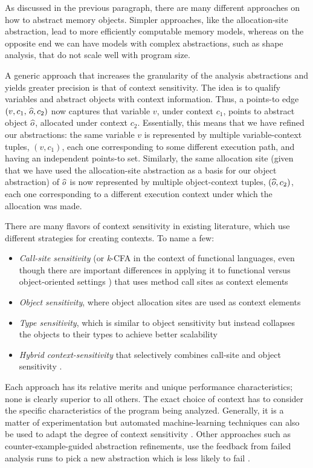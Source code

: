As discussed in the previous paragraph, there are many different
approaches on how to abstract memory objects. Simpler approaches, like
the allocation-site abstraction, lead to more efficiently computable
memory models, whereas on the opposite end we can have models with
complex abstractions, such as shape analysis, that do not scale well
with program size.

A generic approach that increases the granularity of the analysis
abstractions and yields greater precision is that of context
sensitivity. The idea is to qualify variables and abstract objects
with context information. Thus, a points-to edge
\((v, c_1,\, \widehat{o}, c_2)\) now captures that variable \(v\), under
context \(c_1\), points to abstract object \(\widehat{o}\), allocated
under context \(c_2\). Essentially, this means that we have refined
our abstractions: the same variable \(v\) is represented by multiple
variable-context tuples, \((v, c_1)\), each one corresponding to some
different execution path, and having an independent points-to
set. Similarly, the same allocation site (given that we have used the
allocation-site abstraction as a basis for our object abstraction) of
\(\widehat{o}\) is now represented by multiple object-context tuples,
\((\widehat{o}, c_2)\), each one corresponding to a different execution
context under which the allocation was made.

There are many flavors of context sensitivity in existing literature,
which use different strategies for creating contexts. To name a few:
\begin{itemize}[--]
\item \emph{Call-site sensitivity} (or \emph{k}-CFA in the context of
  functional languages, even though there are important differences in
  applying it to functional versus object-oriented settings
  \cite{pldi/MightSH10}) that uses method call sites as context
  elements \cite{Sharir:Interprocedural,shivers:thesis}
\item \emph{Object sensitivity}, where object allocation sites are used as
  context elements \cite{issta/MilanovaRR02,tosem/MilanovaRR05}
\item \emph{Type sensitivity}, which is similar to object sensitivity but
  instead collapses the objects to their types to achieve better
  scalability \cite{popl/SmaragdakisBL11}
\item \emph{Hybrid context-sensitivity} that selectively combines
  call-site and object sensitivity \cite{pldi/KastrinisS13}.
\end{itemize}
Each approach has its relative merits and unique performance
characteristics; none is clearly superior to all others. The exact
choice of context has to consider the specific characteristics of the
program being analyzed. Generally, it is a matter of experimentation
but automated machine-learning techniques can also be used to adapt
the degree of context sensitivity
\cite{oopsla/OhYY15,pldi/LiangN11,popl/LiangTN11,popl/GrigoreY16}.
%
Other approaches such as counter-example-guided abstraction refinements,
use the feedback from failed analysis runs to pick a new abstraction
which is less likely to fail
\cite{pldi/ZhangNY13,pldi/ZhangMGNY14,tacas/GulavaniR06}.

